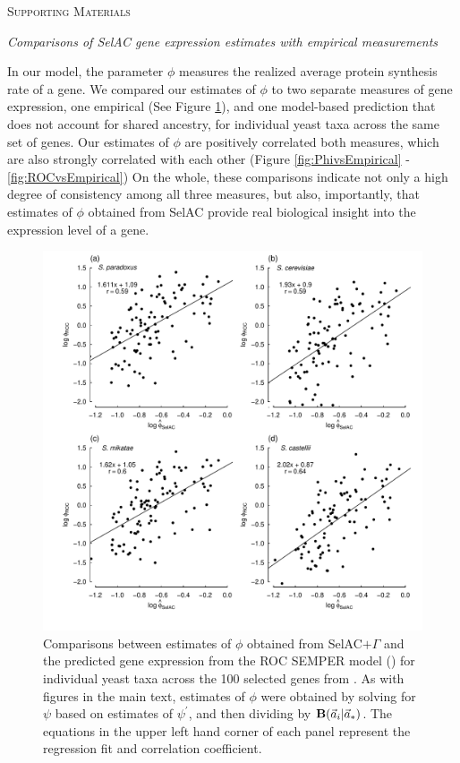 \documentclass[12pt,letterpaper]{article}
\renewcommand{\section}[1]{%
\bigskip
\begin{center}
\begin{Large}
\normalfont\scshape #1
\medskip
\end{Large}
\end{center}}
\renewcommand{\subsection}[1]{%
\bigskip
\begin{center}
\begin{large}
\normalfont\itshape #1
\end{large}
\end{center}}
\newcommand{\Funcaveci}{\ensuremath{\Func(\aveci|\aoptvec)}\xspace}
\newcommand{\Func}{\ensuremath{\text{\textbf{B}}}\xspace}
\newcommand{\selacplusgamma}{SelAC$+\Gamma$\xspace}
\newcommand{\aoptvec}{\ensuremath{\Vec{a}_*}\xspace}
\newcommand{\aveci}{\ensuremath{\Vec{a}_i}\xspace}
\newcommand{\psiprime}{\ensuremath{\psi^\prime}\xspace}
\begin{document}
\section{Supporting Materials}

\subsection{Comparisons of SelAC gene expression estimates with empirical measurements}

In our model, the parameter $\phi$ measures the realized average protein synthesis rate of a gene.
We compared our estimates of $\phi$ to two separate measures of gene expression, one empirical (See Figure \ref{fig:PhivsROC}), and one model-based prediction that does not account for shared ancestry, for individual yeast taxa across the same set of genes.
Our estimates of $\phi$ are positively correlated both measures, which are also strongly correlated with each other (Figure \ref{fig:PhivsEmpirical} - \ref{fig:ROCvsEmpirical})
On the whole, these comparisons indicate not only a high degree of consistency among all three measures, but also, importantly, that estimates of $\phi$ obtained from SelAC provide real biological insight into the expression level of a gene.

\begin{figure}[H]
  \centering
  \includegraphics[width=0.9\linewidth]{FIGURE_S1_SelACwG_vs_ROC_by_spp.pdf}
  \caption{Comparisons between estimates of $\phi$ obtained from \selacplusgamma and the predicted gene expression from the ROC SEMPER model (\citet{GilchristEtAl2015}) for individual yeast taxa across the 100 selected genes from \citet{SalichosAndRokas2013}.
    	As with figures in the main text, estimates of $\phi$ were obtained by solving for $\psi$ based on estimates of $\psiprime$, and then dividing by \Funcaveci.
  		The equations in the upper left hand corner of each panel represent the regression fit and correlation coefficient.
  }
  \label{fig:PhivsROC}
\end{figure}
\end{document}
